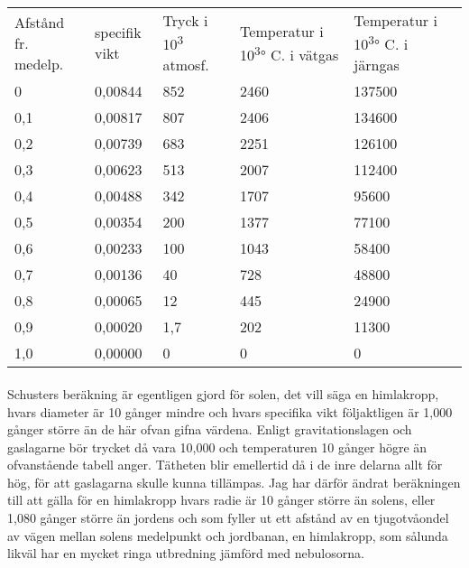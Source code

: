 \documentclass[a4paper, 12pt, oneside, swedish]{article}
\begin{document}
\begin{table}[H]
    \centering
    \footnotesize
    \begin{tabular}{p{15mm} p{15mm} p{15mm} p{21mm} p{23mm}}
        Afstånd fr. medelp. & specifik vikt & Tryck i 10\textsuperscript{3} atmosf. & Temperatur i 10\textsuperscript{3}° C. i vätgas & Temperatur i 10\textsuperscript{3}° C. i järngas \\
        0 & 0,00844 & 852 & 2460 & 137500 \\
        0,1 & 0,00817 & 807 & 2406 & 134600 \\
        0,2 & 0,00739 & 683 & 2251 & 126100 \\ 
        0,3 & 0,00623 & 513 & 2007 & 112400 \\
        0,4 & 0,00488 & 342 & 1707 & 95600 \\
        0,5 & 0,00354 & 200 & 1377 & 77100 \\
        0,6 & 0,00233 & 100 & 1043 & 58400 \\
        0,7 & 0,00136 & 40 & 728 & 48800 \\
        0,8 & 0,00065 & 12 & 445 & 24900 \\
        0,9 & 0,00020 & 1,7 & 202 & 11300 \\
        1,0 & 0,00000 & 0 & 0 & 0 \\
    \end{tabular}
\end{table}
\paragraph{}
Schusters beräkning är egentligen gjord för solen, det vill säga en himlakropp, hvars diameter är 10 gånger mindre och hvars specifika vikt följaktligen är 1,000 gånger större än de här ofvan gifna värdena. Enligt gravitationslagen och gaslagarne bör trycket då vara 10,000 och temperaturen 10 gånger högre än ofvanstående tabell anger. Tätheten blir emellertid då i de inre delarna allt för hög, för att gaslagarna skulle kunna tillämpas. Jag har därför ändrat beräkningen till att gälla för en himlakropp hvars radie är 10 gånger större än solens, eller 1,080 gånger större än jordens och som fyller ut ett afstånd av en tjugotvåondel av vägen mellan solens medelpunkt och jordbanan, en himlakropp, som sålunda likväl har en mycket ringa utbredning jämförd med nebulosorna.
\end{document}

